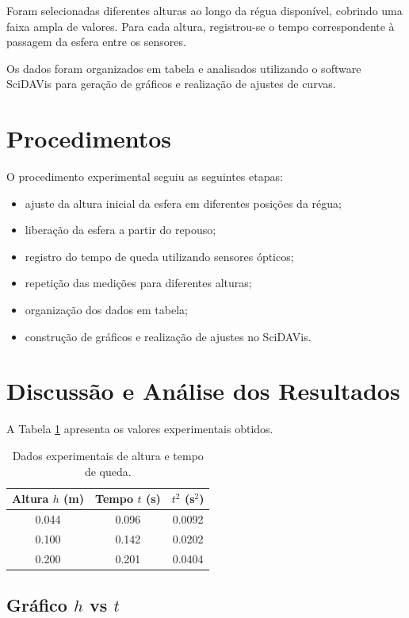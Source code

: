 \documentclass[12pt,a4paper]{article}
\begin{document}
Foram selecionadas diferentes alturas ao longo da régua disponível, cobrindo uma faixa ampla de valores. Para cada altura, registrou-se o tempo correspondente à passagem da esfera entre os sensores.

Os dados foram organizados em tabela e analisados utilizando o software SciDAVis para geração de gráficos e realização de ajustes de curvas.

\section{Procedimentos}

O procedimento experimental seguiu as seguintes etapas:

\begin{itemize}
\item ajuste da altura inicial da esfera em diferentes posições da régua;
\item liberação da esfera a partir do repouso;
\item registro do tempo de queda utilizando sensores ópticos;
\item repetição das medições para diferentes alturas;
\item organização dos dados em tabela;
\item construção de gráficos e realização de ajustes no SciDAVis.
\end{itemize}

\section{Discussão e Análise dos Resultados}

A Tabela \ref{tab:dados} apresenta os valores experimentais obtidos.

\begin{table}[h]
\centering
\begin{tabular}{ccc}
\toprule
Altura $h$ (m) & Tempo $t$ (s) & $t^2$ (s$^2$) \\
\midrule
0.044 & 0.096 & 0.0092 \\
0.100 & 0.142 & 0.0202 \\
0.200 & 0.201 & 0.0404 \\
\bottomrule
\end{tabular}
\caption{Dados experimentais de altura e tempo de queda.}
\label{tab:dados}
\end{table}

\subsection{Gráfico $h$ vs $t$}
\end{document}
